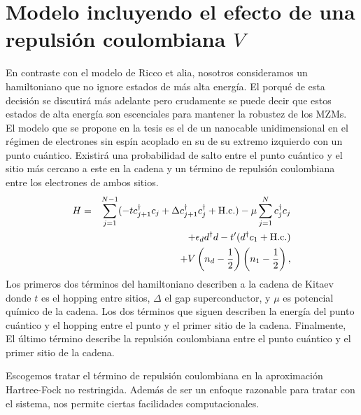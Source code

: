 %
%
\chapter{Modelo incluyendo el efecto de una repulsi\'{o}n coulombiana $V$}
En contraste con el modelo de Ricco et alia, nosotros consideramos un hamiltoniano que no ignore estados de m\'{a}s alta energ\'{i}a. El porqu\'{e} de esta decisi\'{o}n se discutir\'{a} m\'{a}s adelante pero crudamente se puede decir que estos estados de alta energ\'{i}a son escenciales para mantener la robustez de los MZMs. El modelo que se propone en la tesis es el de un nanocable unidimensional en el r\'{e}gimen de electrones sin esp\'{i}n acoplado en su de su extremo izquierdo con un punto cu\'{a}ntico. Existir\'{a} una probabilidad de salto entre el punto cu\'{a}ntico y el sitio m\'{a}s cercano a este en la cadena y un t\'{e}rmino de repulsi\'{o}n coulombiana entre los electrones de ambos sitios. 
\begin{eqnarray}
H &=&\sum_{j=1}^{N-1}(-tc_{j+1}^{\dagger }c_{j}+\Delta c_{j+1}^{\dagger
}c_{j}^{\dagger }+\mathrm{H.c.})-\mu \sum_{j=1}^{N}c_{j}^{\dagger }c_{j} 
\notag \\
&&+\epsilon_{d}d^{\dagger }d-t^\prime (d^{\dagger }c_{1}+\mathrm{H.c.}) \notag \\
&&+V\left( n_d  -\frac{1}{2} \right) 
\left( n_1 -\frac{1}{2} \right),  \label{ham}
\end{eqnarray}
Los primeros dos t\'{e}rminos del hamiltoniano describen a la cadena de Kitaev donde $t$ es el hopping entre sitios, $\Delta$ el gap superconductor, y $\mu$ es potencial qu\'{i}mico de la cadena. Los dos t\'{e}rminos que siguen describen la energ\'{i}a del punto cu\'{a}ntico y el hopping entre el punto y el primer sitio de la cadena. Finalmente, El \'{u}ltimo t\'{e}rmino describe la repulsi\'{o}n coulombiana entre el punto cu\'{a}ntico y el primer sitio de la cadena.

Escogemos tratar el t\'{e}rmino de repulsi\'{o}n coulombiana en la aproximaci\'{o}n Hartree-Fock no restringida. Adem\'{a}s de ser un enfoque razonable para tratar con el sistema, nos permite ciertas facilidades computacionales.

